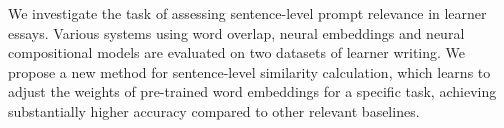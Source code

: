 We investigate the task of assessing sentence-level prompt relevance in learner essays. Various systems using word overlap, neural embeddings and neural compositional models are evaluated on two datasets of learner writing. We propose a new method for sentence-level similarity calculation, which learns to adjust the weights of pre-trained word embeddings for a specific task, achieving substantially higher accuracy compared to other relevant baselines.
